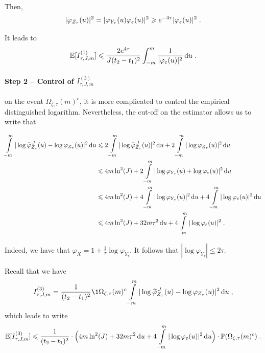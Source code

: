 Then, 
	\begin{equation*}
	| \varphi_{Z_{\tau}}(u)|^2 = |\varphi_{Y_\tau}(u) \varphi_{\varepsilon}(u)|^2 \geqslant e^{-4\tau} |\varphi_{\varepsilon}(u)|^2
 \; .
	\end{equation*}

It leads to 
    \begin{equation*}
        \mathbb{E}[I_{\tau, J, m}^{(1)}]
        \leqslant 
        \frac{2 e^{4\tau}}{J (t_2 - t_1)^2}  \int_{-m}^{m} 
        \frac{1}{|\varphi_{\varepsilon}(u)|^2} \, \mathrm du
        \; .
    \end{equation*}

\paragraph{\textbf{Step 2} -- Control of $I_{\tau, J, m}^{(3)}$}


    on the event $\Omega_{\zeta, \tau}(m)^c$, it is more complicated to control the empirical distinguished logarithm. 
    Nevertheless, the cut-off on the estimator allows us to write that 


\begin{align*}
	 \int\limits_{-m}^m | \log \widetilde \varphi_{Z_{\tau}}^{\, J}  (u) - \log\varphi_{Z_{\tau}} (u)|^2 \, \mathrm du 
	 &\leqslant 
	 2  \int\limits_{-m}^m | \log \widetilde \varphi_{Z_{\tau}}^{\, J}  (u)|^2 \, \mathrm du 
	 + 
	 2 \int\limits_{-m}^m | \log\varphi_{Z_{\tau}} (u)|^2 \, \mathrm du
	 \\
	 &\leqslant 
	 4 m \ln^2(J)
	 + 
	 2 \int\limits_{-m}^m | \log\varphi_{Y_{\tau}}(u) + \log\varphi_\varepsilon (u)|^2 \, \mathrm du \\
	 &\leqslant 
	 4 m \ln^2(J)
	 + 
	 4 \int\limits_{-m}^m | \log\varphi_{Y_{\tau}}(u)|^2 \, \mathrm du 
	 +
	 4 \int\limits_{-m}^m | \log\varphi_\varepsilon (u)|^2 \, \mathrm du\\
	 &\leqslant 
	 4 m \ln^2(J)
	 + 
	 32 m \tau^2 \, \mathrm du 
	 +
	 4 \int\limits_{-m}^m | \log\varphi_\varepsilon (u)|^2
	 \; .
\end{align*}

Indeed, we have that $\varphi_X = 1 + \frac{1}{\tau}  \log\varphi_{Y_{\tau}}
	$. It follows that $|\log\varphi_{Y_{\tau}}| \leq 2 \tau$.

Recall that we have 
	\begin{equation*}
		I_{\tau, J, m}^{(3)} 
		= \frac{1}{(t_2 - t_1)^2}
		\1{\Omega_{\zeta, \tau}(m)^c}  \int\limits_{-m}^m | \log \tilde \varphi_{Z_{\tau}}^{\, J}  (u) - \log\varphi_{Z_{\tau}} (u)|^2 \du
	\eqfinv
	\end{equation*}
which leads to write
    \begin{equation*}
        \mathbb{E}[I_{\tau, J, m}^{(3)}] 
        \leqslant 
     \frac{1}{(t_2 - t_1)^2} \cdot \Big( 
	 4 m \ln^2(J)
	 + 
	 32 m \tau^2 \, \mathrm du 
	 +
	 4 \int\limits_{-m}^m | \log\varphi_\varepsilon (u)|^2 \, \mathrm du \Big)
	 \cdot 
	 \mathbb{P} (\Omega_{\zeta, \tau}(m)^c)
	 \; .
	\end{equation*}


